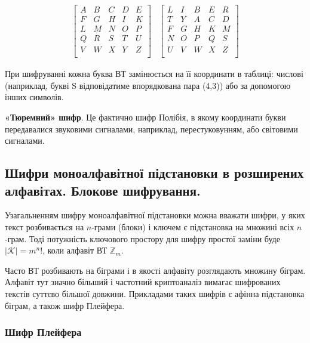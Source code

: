 $$\begin{matrix}
    \begin{bmatrix}
        A & B & C & D & E  \\
        F & G & H & I & K  \\
        L & M & N & O & P  \\
        Q & R & S & T & U  \\
        V & W & X & Y & Z  \\
    \end{bmatrix}
    &
    \begin{bmatrix}
        L & I & B & E & R  \\
        T & Y & A & C & D  \\
        F & G & H & K & M  \\
        N & O & P & Q & S  \\
        U & V & W & X & Z  \\
    \end{bmatrix}
\end{matrix}$$

При шифруванні кожна буква ВТ замінюється на її координати в таблиці:
числові (наприклад, букві S відповідатиме впорядкована пара (4,3)) або за
допомогою інших символів.

\textbf{«Тюремний» шифр}. Це фактично шифр Полібія, в якому координати букви
передавалися звуковими сигналами, наприклад, перестуковунням, або
світовими сигналами.

\subsection{Шифри моноалфавітної підстановки в розширених алфавітах. Блокове шифрування.}

Узагальненням шифру моноалфавітної підстановки можна вважати
шифри, у яких текст розбивається на $n$-грами (блоки) і ключем є підстановка
на множині всіх $n$-грам. Тоді потужність ключового простору для шифру
простої заміни буде $|\mathcal{K}| = m^{n}!$, коли алфавіт ВТ $\mathbb{Z}_m$.

Часто ВТ розбивають на біграми і в якості алфавіту розглядають
множину біграм. Алфавіт тут значно більший і частотний криптоаналіз
вимагає шифрованих текстів суттєво більшої довжини. Прикладами таких
шифрів є афінна підстановка біграм, а також шифр Плейфера.

\subsubsection{Шифр Плейфера}

